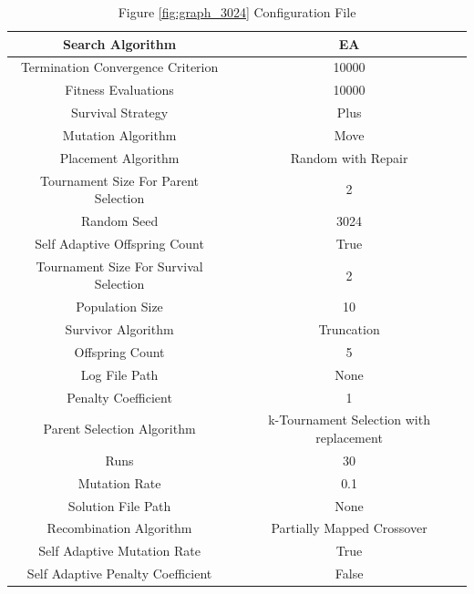 \documentclass{standalone}
\begin{document}
\begin{table}[!htb]
	\centering
	\caption{Figure \ref{fig:graph_3024} Configuration File}
	\label{tab:graph_3024}
	\begin{tabular}{| c | c |}
		\hline
		Search Algorithm		& EA		 \\
		\hline
		Termination Convergence Criterion		& 10000		 \\
		\hline
		Fitness Evaluations		& 10000		 \\
		\hline
		Survival Strategy		& Plus		 \\
		\hline
		Mutation Algorithm		& Move		 \\
		\hline
		Placement Algorithm		& Random with Repair		 \\
		\hline
		Tournament Size For Parent Selection		& 2		 \\
		\hline
		Random Seed		& 3024		 \\
		\hline
		Self Adaptive Offspring Count		& True		 \\
		\hline
		Tournament Size For Survival Selection		& 2		 \\
		\hline
		Population Size		& 10		 \\
		\hline
		Survivor Algorithm		& Truncation		 \\
		\hline
		Offspring Count		& 5		 \\
		\hline
		Log File Path		& None		 \\
		\hline
		Penalty Coefficient		& 1		 \\
		\hline
		Parent Selection Algorithm		& k-Tournament Selection with replacement		 \\
		\hline
		Runs		& 30		 \\
		\hline
		Mutation Rate		& 0.1		 \\
		\hline
		Solution File Path		& None		 \\
		\hline
		Recombination Algorithm		& Partially Mapped Crossover		 \\
		\hline
		Self Adaptive Mutation Rate		& True		 \\
		\hline
		Self Adaptive Penalty Coefficient		& False		 \\
		\hline
	\end{tabular}
\end{table}
\end{document}
